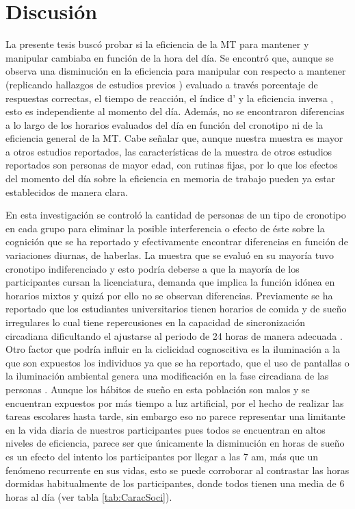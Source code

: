 \documentclass[12pt,letterpaper,final]{article}
\let\cite\cite %
\begin{document}
\section{Discusión}
La presente tesis buscó probar si la eficiencia de la MT para mantener y manipular cambiaba en función de la hora del día. Se encontró que, aunque se observa una disminución en la eficiencia para manipular con respecto a mantener (replicando hallazgos de estudios previos \cite{DEsposito2015, Veltman2003}) evaluado a través porcentaje de respuestas correctas, el tiempo de reacción, el índice d’ y la eficiencia inversa , esto es independiente al momento del día. Además, no se encontraron diferencias a lo largo de los horarios evaluados del día en función del cronotipo ni de la eficiencia general de la MT. Cabe señalar que, aunque nuestra muestra es mayor a otros estudios reportados, las características de la muestra de otros estudios reportados son personas de mayor edad, con rutinas fijas, por lo que los efectos del momento del día sobre la eficiencia en memoria de trabajo pueden ya estar establecidos de manera clara.


En esta investigación se controló la cantidad de personas de un tipo de cronotipo en cada grupo para eliminar la posible interferencia o efecto de éste sobre la cognición que se ha reportado \cite{Schmidt2015} y efectivamente encontrar diferencias en función de variaciones diurnas, de haberlas. La muestra que se evaluó en su mayoría tuvo cronotipo indiferenciado y esto podría deberse a que la mayoría de los participantes cursan la licenciatura, demanda que implica la función idónea en horarios mixtos y quizá por ello no se observan diferencias. Previamente se ha reportado que los estudiantes universitarios tienen horarios de comida y de sueño irregulares \cite{Lund2010} lo cual tiene repercusiones en la capacidad de sincronización circadiana dificultando el ajustarse al periodo de 24 horas de manera adecuada \cite{Harma1993}. Otro factor que podría influir en la ciclicidad cognoscitiva es la iluminación a la que son expuestos los individuos ya que se ha reportado, que el uso de pantallas o la iluminación ambiental genera una modificación en la fase circadiana de las personas \cite{Chang2015,Chang2011,Gronfier2007}. Aunque los hábitos de sueño en esta población son malos y se encuentran expuestos por más tiempo a luz artificial, por el hecho de realizar las tareas escolares hasta tarde, sin embargo eso no parece representar una limitante en la vida diaria de nuestros participantes pues todos se encuentran en altos niveles de eficiencia, parece ser que únicamente la disminución en horas de sueño es un efecto del intento los participantes por llegar a las 7 am, más que un fenómeno recurrente en sus vidas, esto se puede corroborar al contrastar las horas dormidas habitualmente de los participantes, donde todos tienen una media de 6 horas al día (ver tabla \ref{tab:CaracSoci}).
 
\end{document}

